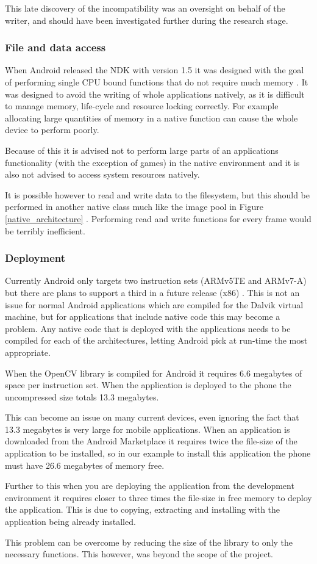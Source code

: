 This late discovery of the incompatibility was an oversight on behalf of the writer, and should have been investigated further during the research stage.

\subsubsection{File and data access}
When Android released the NDK with version 1.5 it was designed with the goal of performing single CPU bound functions that do not require much memory \cite{ndk11}. It was designed to avoid the writing of whole applications natively, as it is difficult to manage memory, life-cycle and resource locking correctly. For example allocating large quantities of memory in a native function can cause the whole device to perform poorly.

Because of this it is advised not to perform large parts of an applications functionality (with the exception of games) in the native environment and it is also not advised to access system resources natively.

It is possible however to read and write data to the filesystem, but this should be performed in another native class much like the image pool in Figure \ref{native_architecture} \cite{benfield10}. Performing read and write functions for every frame would be terribly inefficient. 

\subsubsection{Deployment}
Currently Android only targets two instruction sets (ARMv5TE and ARMv7-A) but there are plans to support a third in a future release (x86) \cite{ndk11}. This is not an issue for normal Android applications which are compiled for the Dalvik virtual machine, but for applications that include native code this may become a problem. Any native code that is deployed with the applications needs to be compiled for each of the architectures, letting Android pick at run-time the most appropriate.

When the OpenCV library is compiled for Android it requires 6.6 megabytes of space per instruction set. When the application is deployed to the phone the uncompressed size totals 13.3 megabytes.

This can become an issue on many current devices, even ignoring the fact that 13.3 megabytes is very large for mobile applications. When an application is downloaded from the Android Marketplace it requires twice the file-size of the application to be installed, so in our example to install this application the phone must have 26.6 megabytes of memory free. 

Further to this when you are deploying the application from the development environment it requires closer to three times the file-size in free memory to deploy the application. This is due to copying, extracting and installing with the application being already installed.

This problem can be overcome by reducing the size of the library to only the necessary functions. This however, was beyond the scope of the project.


